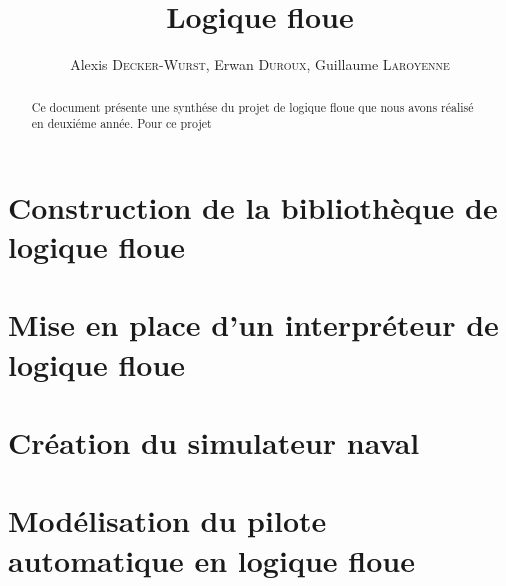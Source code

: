 \documentclass[a4paper,11pt]{article}
\title{Logique floue}
\author{Alexis \textsc{Decker-Wurst}, Erwan  \textsc{Duroux}, Guillaume  \textsc{Laroyenne}}
\begin{document}
    \maketitle

    \begin{abstract}
        Ce document présente une synthése du projet de logique floue que nous avons réalisé en deuxiéme année.
        Pour ce projet
    \end{abstract}

    \section{Construction de la bibliothèque de logique floue}

    \section{Mise en place d'un interpréteur de logique floue}

    \section{Création du simulateur naval}

    \section{Modélisation du pilote automatique en logique floue}
\end{document}
